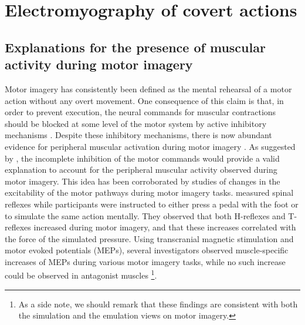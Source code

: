 \documentclass[a4paper,12pt,oneside,oldfontcommands]{memoir}
\let\rmarkdownfootnote\footnote%
\def\footnote{\protect\rmarkdownfootnote}
\begin{document}
\section{Electromyography of covert actions}\label{emg}

\subsection{Explanations for the presence of muscular activity during
motor
imagery}\label{explanations-for-the-presence-of-muscular-activity-during-motor-imagery}

Motor imagery has consistently been defined as the mental rehearsal of a
motor action without any overt movement. One consequence of this claim
is that, in order to prevent execution, the neural commands for muscular
contractions should be blocked at some level of the motor system by
active inhibitory mechanisms \citep[for a review,
see][]{guillot_imagining_2012}. Despite these inhibitory mechanisms,
there is now abundant evidence for peripheral muscular activation during
motor imagery \citep[for a review,
see][]{guillot_contribution_2005, guillot_imagining_2012}. As suggested
by \citet{jeannerod_representing_1994}, the incomplete inhibition of the
motor commands would provide a valid explanation to account for the
peripheral muscular activity observed during motor imagery. This idea
has been corroborated by studies of changes in the excitability of the
motor pathways during motor imagery tasks. \citet{bonnet_mental_1997}
measured spinal reflexes while participants were instructed to either
press a pedal with the foot or to simulate the same action mentally.
They observed that both H-reflexes and T-reflexes increased during motor
imagery, and that these increases correlated with the force of the
simulated pressure. Using transcranial magnetic stimulation and motor
evoked potentials (MEPs), several investigators observed muscle-specific
increases of MEPs during various motor imagery tasks, while no such
increase could be observed in antagonist muscles
\citep[e.g.,][]{fadiga_corticospinal_1999, rossini_corticospinal_1999}\footnote{As
  a side note, we should remark that these findings are consistent with
  both the simulation and the emulation views on motor imagery.}.
\end{document}
